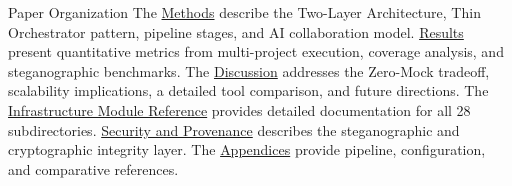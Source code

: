 \documentclass[
  ignorenonframetext,
]{beamer}
\begin{document}
\begin{frame}[allowframebreaks]{Paper Organization}
\protect{}\label{paper-organization}
The \href{03a_architecture.md\#methods}{Methods} describe the Two-Layer
Architecture, Thin Orchestrator pattern, pipeline stages, and AI
collaboration model. \href{04_results.md\#results}{Results} present
quantitative metrics from multi-project execution, coverage analysis,
and steganographic benchmarks. The
\href{05a_zeromock_tradeoff.md\#the-zero-mock-tradeoff}{Discussion}
addresses the Zero-Mock tradeoff, scalability implications, a detailed
tool comparison, and future directions. The
\href{06_infrastructure_modules.md\#infrastructure-module-reference}{Infrastructure
Module Reference} provides detailed documentation for all 28
subdirectories.
\href{07_security_provenance.md\#security-and-provenance}{Security and
Provenance} describes the steganographic and cryptographic integrity
layer. The
\href{08a_appendix_pipeline.md\#appendix-pipeline}{Appendices} provide
pipeline, configuration, and comparative references.
\end{frame}
\end{document}
